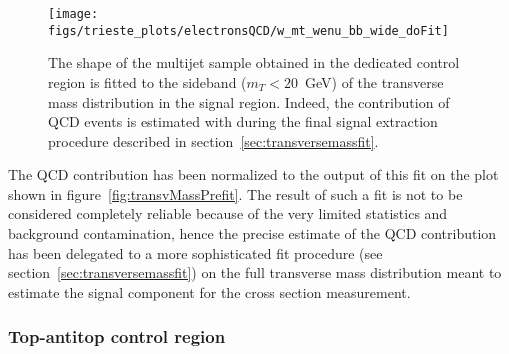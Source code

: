 \begin{figure}[htb]
	\begin{center}
		\leavevmode
		\texttt{[image: figs/trieste\_plots/electronsQCD/w\_mt\_wenu\_bb\_wide\_doFit]}
	\end{center}
	\caption{The shape of the multijet sample obtained in the dedicated control region is fitted 
          to the sideband ($m_{T} < 20$~GeV) of the transverse mass distribution in the signal region.
          Indeed, the contribution of QCD events is estimated with during the final 
          signal extraction procedure described in section~\ref{sec:transversemassfit}.}
	\label{fig:qcdpostfit}
\end{figure}

The QCD contribution has been normalized to the output of this fit on the 
plot shown in figure~\ref{fig:transvMassPrefit}.
The result of such a fit is not to be considered completely reliable 
because of the very limited statistics and background contamination,
hence the precise estimate of the QCD contribution has been delegated 
to a more sophisticated fit procedure (see section~\ref{sec:transversemassfit}) 
on the full transverse mass distribution 
meant to estimate the signal component for the cross section measurement.

\subsubsection{Top-antitop control region}
\label{sec:ttbar}

